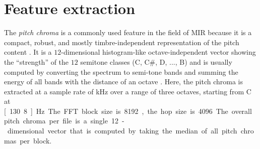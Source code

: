 \documentclass{article}
\begin{document}


\section{Feature extraction}\label{sec:pitch_chroma}

The \textit{pitch chroma} is a commonly used feature in the field of MIR  because it is a compact, robust, and mostly timbre-independent representation of the pitch content  \cite{muller_information_2007}. It is a $12$-dimensional histogram-like octave-independent vector showing the ``strength'' of the $12$ semitone classes (C, C\#, D, ..., B) and is usually computed by converting the spectrum to semi-tone bands and summing the energy of all bands with the distance of an octave \cite{fujishima_realtime_1999}. 
Here, the pitch chroma is extracted at a sample rate of \unit[10]{kHz} over a range of three octaves, starting from C at \unit[130.8]{Hz}. The FFT block size is 8192, the hop size is 4096.
The overall pitch chroma per file is a single 12-dimensional vector that is computed by taking the median of all pitch chromas per block. 
\end{document}
